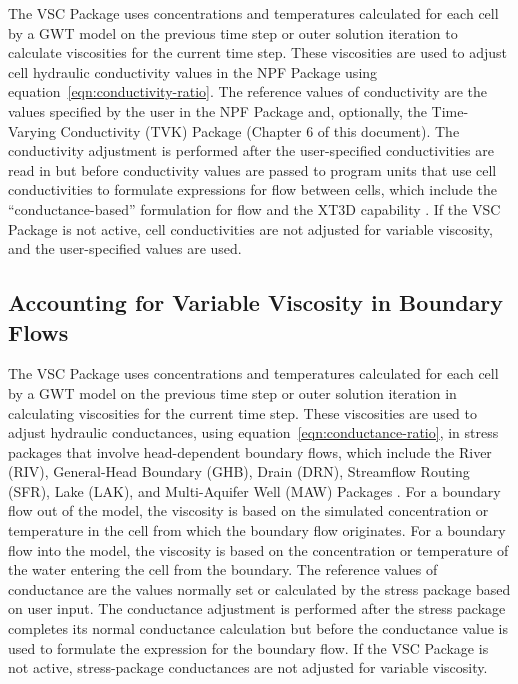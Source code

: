 The VSC Package uses concentrations and temperatures calculated for each cell by a GWT model on the previous time step or outer solution iteration to calculate viscosities for the current time step. These viscosities are used to adjust cell hydraulic conductivity values in the NPF Package using equation~\ref{eqn:conductivity-ratio}. The reference values of conductivity are the values specified by the user in the NPF Package and, optionally, the Time-Varying Conductivity (TVK) Package (Chapter 6 of this document). The conductivity adjustment is performed after the user-specified conductivities are read in but before conductivity values are passed to program units that use cell conductivities to formulate expressions for flow between cells, which include the ``conductance-based'' formulation for flow and the XT3D capability \citep{modflow6xt3d}. If the VSC Package is not active, cell conductivities are not adjusted for variable viscosity, and the user-specified values are used.

\subsection{Accounting for Variable Viscosity in Boundary Flows} \label{sec:gwfvsc}

The VSC Package uses concentrations and temperatures calculated for each cell by a GWT model on the previous time step or outer solution iteration in calculating viscosities for the current time step. These viscosities are used to adjust hydraulic conductances, using equation~\ref{eqn:conductance-ratio}, in stress packages that involve head-dependent boundary flows, which include the River (RIV), General-Head Boundary (GHB), Drain (DRN), Streamflow Routing (SFR), Lake (LAK), and Multi-Aquifer Well (MAW) Packages \citep{modflow6gwf}. For a boundary flow out of the model, the viscosity is based on the simulated concentration or temperature in the cell from which the boundary flow originates. For a boundary flow into the model, the viscosity is based on the concentration or temperature of the water entering the cell from the boundary. The reference values of conductance are the values normally set or calculated by the stress package based on user input. The conductance adjustment is performed after the stress package completes its normal conductance calculation but before the conductance value is used to formulate the expression for the boundary flow. If the VSC Package is not active, stress-package conductances are not adjusted for variable viscosity.

